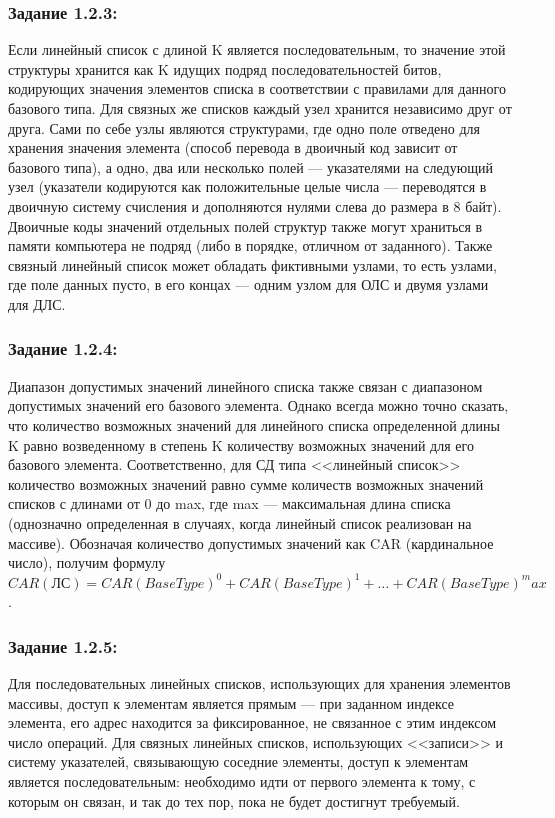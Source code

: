 \documentclass[12pt]{article}
\begin{document}
{	\subsubsection{Задание 1.2.3:}
	\label{task_1_2_3}
	Если линейный список с длиной K является последовательным, то значение этой структуры хранится как K идущих подряд последовательностей битов, кодирующих значения элементов списка в соответствии с правилами для данного базового типа. Для связных же списков каждый узел хранится независимо друг от друга. Сами по себе узлы являются структурами, где одно поле отведено для хранения значения элемента (способ перевода в двоичный код зависит от базового типа), а одно, два или несколько полей --- указателями на следующий узел (указатели кодируются как положительные целые числа --- переводятся в двоичную систему счисления и дополняются нулями слева до размера в 8 байт). Двоичные коды значений отдельных полей структур также могут храниться в памяти компьютера не подряд (либо в порядке, отличном от заданного). Также связный линейный список может обладать фиктивными узлами, то есть узлами, где поле данных пусто, в его концах --- одним узлом для ОЛС и двумя узлами для ДЛС.

	\subsubsection{Задание 1.2.4:}
	\label{task_1_2_4}
	Диапазон допустимых значений линейного списка также связан с диапазоном допустимых значений его базового элемента. Однако всегда можно точно сказать, что количество возможных значений для линейного списка определенной длины K равно возведенному в степень K количеству возможных значений для его базового элемента. Соответственно, для СД типа <<линейный список>> количество возможных значений равно сумме количеств возможных значений списков с длинами от 0 до max, где max --- максимальная длина списка (однозначно определенная в случаях, когда линейный список реализован на массиве). Обозначая количество допустимых значений как CAR (кардинальное число), получим формулу $CAR(ЛС) = CAR(BaseType)^0 + CAR(BaseType)^1 +… + CAR(BaseType)^max$.
	
	\subsubsection{Задание 1.2.5:}
	\label{task_1_2_5}
	Для последовательных линейных списков, использующих для хранения элементов массивы, доступ к элементам является прямым --- при заданном индексе элемента, его адрес находится за фиксированное, не связанное с этим индексом число операций. Для связных линейных списков, использующих <<записи>> и систему указателей, связывающую соседние элементы, доступ к элементам является последовательным: необходимо идти от первого элемента к тому, с которым он связан, и так до тех пор, пока не будет достигнут требуемый.
	
}
\end{document}
